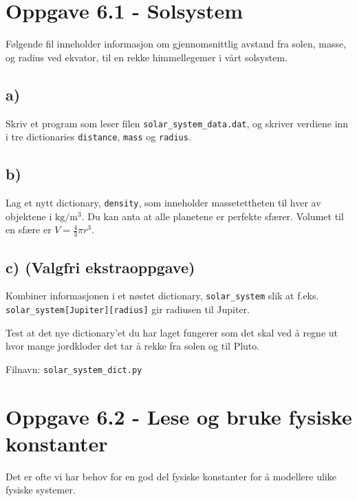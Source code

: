 \documentclass[10pt,a4paper]{article}
\begin{document}
\section*{Oppgave 6.1 - Solsystem}
Følgende fil inneholder informasjon om gjennomsnittlig avstand fra solen, masse, og radius ved ekvator, til en rekke himmellegemer i vårt solsystem.
 

 
\subsection*{a)}
Skriv et program som leser filen \texttt{solar\_system\_data.dat}, og skriver verdiene inn i tre dictionaries \texttt{distance}, \texttt{mass} og \texttt{radius}. 
 
\subsection*{b)}
Lag et nytt dictionary, \texttt{density}, som inneholder massetettheten til hver av objektene i $\mathrm{kg/m^3}$. Du kan anta at alle planetene er perfekte sfærer. Volumet til en sfære er $V = \frac{4}{3}\pi r^3$.
 
\subsection*{c) (Valgfri ekstraoppgave)}
Kombiner informasjonen i et nøstet dictionary, \texttt{solar\_system} slik at f.eks. \texttt{solar\_system[Jupiter][radius]} gir radiusen til Jupiter.
 
Test at det nye dictionary'et du har laget fungerer som det skal ved å regne ut hvor mange jordkloder det tar å rekke fra solen og til Pluto.
 
Filnavn: \texttt{solar\_system\_dict.py}
 
 
 
 
 
 
 
\section*{Oppgave 6.2 - Lese og bruke fysiske konstanter}
Det er ofte vi har behov for en god del fysiske konstanter for å modellere ulike fysiske systemer. 
\end{document}
